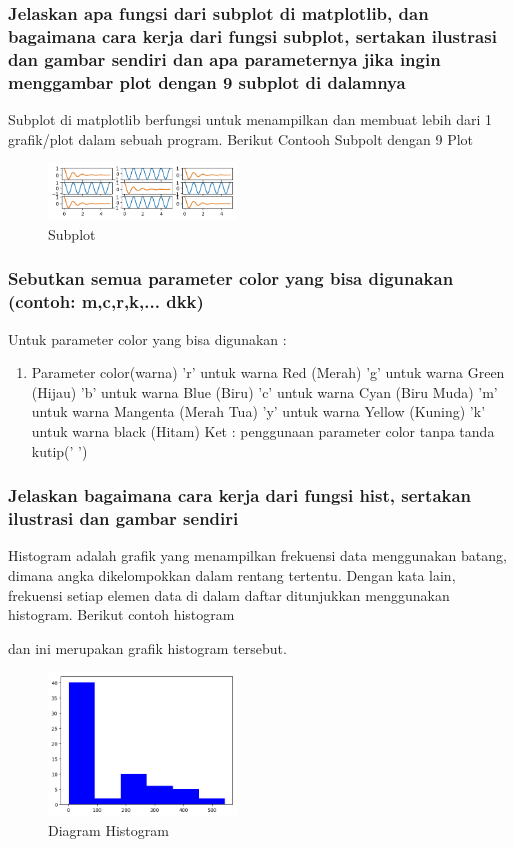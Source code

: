 \subsubsection{Jelaskan apa fungsi dari subplot di matplotlib, dan bagaimana cara kerja dari fungsi subplot, sertakan ilustrasi dan gambar sendiri dan apa parameternya jika ingin menggambar plot dengan 9 subplot di dalamnya}
\hfill \break
Subplot di matplotlib berfungsi untuk menampilkan dan membuat lebih dari 1 grafik/plot dalam sebuah program.
Berikut Contooh Subpolt dengan 9 Plot

\begin{figure}[H]	
    \includegraphics[width=5cm]{figures/6/1174074/Teori/9_plot.png}
    \centering
    \caption{Subplot}
\end{figure}

\subsubsection{Sebutkan semua parameter color yang bisa digunakan (contoh: m,c,r,k,... dkk)}
\hfill \break
Untuk parameter color yang bisa digunakan :
\begin{enumerate}
    \item Parameter color(warna)
   'r' untuk warna Red (Merah)
    'g' untuk warna Green (Hijau)
    'b' untuk warna Blue (Biru)
   'c' untuk warna Cyan (Biru Muda)
    'm' untuk warna Mangenta (Merah Tua)
    'y' untuk warna Yellow (Kuning)
    'k' untuk warna black (Hitam)
Ket : penggunaan parameter color tanpa tanda kutip(' ')
\end{enumerate}
\subsubsection{Jelaskan bagaimana cara kerja dari fungsi hist, sertakan ilustrasi dan gambar sendiri}
\hfill \break

Histogram adalah grafik yang menampilkan frekuensi data menggunakan batang, dimana angka dikelompokkan dalam rentang tertentu. Dengan kata lain, frekuensi setiap elemen data di dalam daftar ditunjukkan menggunakan histogram. 
Berikut contoh histogram

dan ini merupakan grafik histogram tersebut.
\begin{figure}[H]	
    \includegraphics[width=5cm]{figures/6/1174074/Teori/plot_histogram.png}
    \centering
    \caption{Diagram Histogram}
\end{figure}

